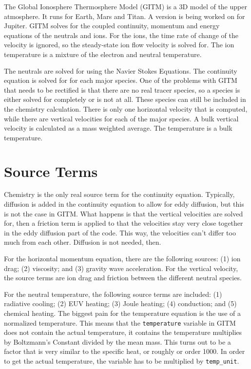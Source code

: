 
The Global Ionosphere Thermosphere Model (GITM) is a 3D model of the
upper atmosphere.  It runs for Earth, Mars and Titan.  A version is
being worked on for Jupiter.  GITM solves for the coupled continuity,
momentum and energy equations of the neutrals and ions.  For the ions,
the time rate of change of the velocity is ignored, so the
steady-state ion flow velocity is solved for.  The ion temperature is
a mixture of the electron and neutral temperature.

The neutrals are solved for using the Navier Stokes Equations.  The
continuity equation is solved for for each major species.  One of the
problems with GITM that needs to be rectified is that there are no
real tracer species, so a species is either solved for completely or
is not at all.  These species can still be included in the chemistry
calculation.  There is only one horizontal velocity that is computed,
while there are vertical velocities for each of the major species.  A
bulk vertical velocity is calculated as a mass weighted average.  The
temperature is a bulk temperature.

\section{Source Terms}

Chemistry is the only real source term for the continuity equation.
Typically, diffusion is added in the continuity equation to allow for
eddy diffusion, but this is not the case in GITM.  What happens is
that the vertical velocities are solved for, then a friction term is
applied to that the velocities stay very close together in the eddy
diffusion part of the code.  This way, the velocities can't differ too
much from each other.  Diffusion is not needed, then.

For the horizontal momentum equation, there are the following sources:
(1) ion drag; (2) viscosity; and (3) gravity wave acceleration.  For
the vertical velocity, the source terms are ion drag and friction
between the different neutral species.

For the neutral temperature, the following source terms are included:
(1) radiative cooling; (2) EUV heating; (3) Joule
heating; (4) conduction; and (5) chemical heating.  The biggest pain
for the temperature equation is the use of a normalized temperature.
This means that the {\tt temperature} variable in GITM does not
contain the actual temperature, it contains the temperature multiplies
by Boltzmann's Constant divided by the mean mass.  This turns out to
be a factor that is very similar to the specific heat, or roughly or
order 1000.  In order to get the actual temperature, the variable has
to be multiplied by {\tt temp\_unit}.

